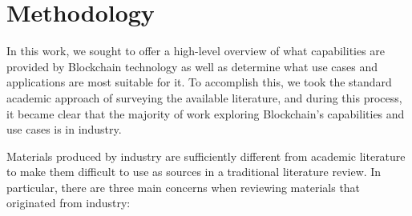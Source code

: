 
\section{Methodology}
In this work, we sought to offer a high-level overview of what capabilities are provided by Blockchain technology as well as determine what use cases and applications are most suitable for it.
To accomplish this, we took the standard academic approach of surveying the available literature, and during this process, it became clear that the majority of work exploring Blockchain's capabilities and use cases is in industry.

Materials produced by industry are sufficiently different from academic literature to make them difficult to use as sources in a traditional literature review.
In particular, there are three main concerns when reviewing materials that originated from industry:

